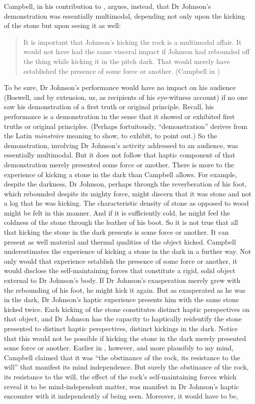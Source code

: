 Campbell, in his contribution to \citet[71]{Campbell:2014aa}, argues, instead, that Dr Johnson's demonstration was essentially multimodal, depending not only upon the kicking of the stone but upon seeing it as well:
\begin{quote}
	It is important that Johnson's kicking the rock is a multimodal affair. It would not have had the same visceral impact if Johnson had rebounded off the thing while kicking it in the pitch dark. That would merely have established the presence of some force or another. (Campbell in \citealt[71]{Campbell:2014aa})
\end{quote}
To be sure, Dr Johnson's performance would have no impact on his audience (Bos\-well, and by extension, us, as recipients of his eye-witness account) if no one saw his demonstration of a first truth or original principle. Recall, his performance is a demonstration in the sense that it showed or exhibited first truths or original principles. (Perhaps fortuitously, ``demonstration'' derives from the Latin \emph{mōnstrāre} meaning to show, to exhibit, to point out.) So the demonstration, involving Dr Johnson's activity addressed to an audience, was essentially multimodal. But it does not follow that haptic component of that demonstration merely presented some force or another. There is more to the experience of kicking a stone in the dark than Campbell allows. For example, despite the darkness, Dr Johnson, perhaps through the reverberation of his foot, which rebounded despite its mighty force, might discern that it was stone and not a log that he was kicking. The characteristic density of stone as opposed to wood might be felt in this manner. And if it is sufficiently cold, he might feel the coldness of the stone through the leather of his boot. So it is not true that all that kicking the stone in the dark presents is some force or another. It can present as well material and thermal qualities of the object kicked. Campbell underestimates the experience of kicking a stone in the dark in a further way. Not only would that experience establish the presence of some force or another, it would disclose the self-maintaining forces that constitute a rigid, solid object external to Dr Johnson's body. If Dr Johnson's exasperation merely grew with the rebounding of his foot, he might kick it again. But as exasperated as he was in the dark, Dr Johnson's haptic experience presents him with the same stone kicked twice. Each kicking of the stone constitutes distinct haptic perspectives on that object, and Dr Johnson has the capacity to haptically reidentify the stone presented to distinct haptic perspectives, distinct kickings in the dark. Notice that this would not be possible if kicking the stone in the dark merely presented some force or another. Earlier in \citet[26]{Campbell:2014aa}, however, and more plausibly to my mind, Campbell claimed that it was ``the obstinance of the rock, its resistance to the will'' that manifest its mind independence. But surely the obstinance of the rock, its resistance to the will, the effect of the rock's self-maintaining forces which reveal it to be mind-independent matter, was manifest in Dr Johnson's haptic encounter with it independently of being seen. Moreover, it would have to be, 